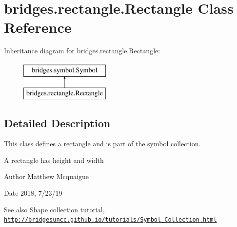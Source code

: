 \hypertarget{classbridges_1_1rectangle_1_1_rectangle}{}\section{bridges.\+rectangle.\+Rectangle Class Reference}
\label{classbridges_1_1rectangle_1_1_rectangle}
Inheritance diagram for bridges.\+rectangle.\+Rectangle\+:\begin{figure}[H]
\begin{center}
\leavevmode
\includegraphics[height=2.000000cm]{classbridges_1_1rectangle_1_1_rectangle}
\end{center}
\end{figure}


\subsection{Detailed Description}
This class defines a rectangle and is part of the symbol collection. 

A rectangle has height and width

\begin{DoxyAuthor}{Author}
Matthew Mcquaigue 
\end{DoxyAuthor}
\begin{DoxyDate}{Date}
2018, 7/23/19
\end{DoxyDate}
\begin{DoxySeeAlso}{See also}
Shape collection tutorial, \href{http://bridgesuncc.github.io/tutorials/Symbol_Collection.html}{\tt http\+://bridgesuncc.\+github.\+io/tutorials/\+Symbol\+\_\+\+Collection.\+html} 
\end{DoxySeeAlso}
